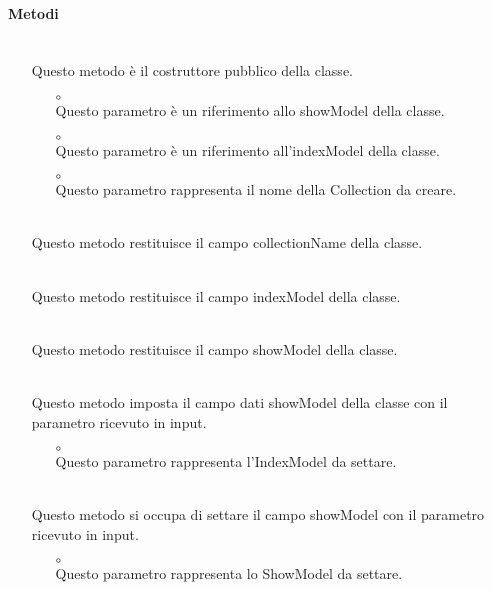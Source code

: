 \paragraph*{Metodi}
\begin{itemize}
\item[]  \\ Questo metodo è il costruttore pubblico della classe.
\begin{itemize}\addtolength{\itemsep}{-0.5\baselineskip}
\item[$\circ$]  \\ Questo parametro è un riferimento allo showModel della classe.
\item[$\circ$]  \\ Questo parametro è un riferimento all'indexModel della classe.
\item[$\circ$]  \\ Questo parametro rappresenta il nome della Collection da creare.
\end{itemize}
\item[]  \\ Questo metodo restituisce il campo collectionName della classe.
\item[]  \\ Questo metodo restituisce il campo indexModel della classe.
\item[]  \\ Questo metodo restituisce il campo showModel della classe.
\item[]  \\ Questo metodo imposta il campo dati showModel della classe con il parametro ricevuto in input.
\begin{itemize}\addtolength{\itemsep}{-0.5\baselineskip}
\item[$\circ$]  \\ Questo parametro rappresenta l'IndexModel da settare.
\end{itemize}
\item[]  \\ Questo metodo si occupa di settare il campo showModel con il parametro ricevuto in input.
\begin{itemize}\addtolength{\itemsep}{-0.5\baselineskip}
\item[$\circ$]  \\ Questo parametro rappresenta lo ShowModel da settare.
\end{itemize}
\end{itemize}

